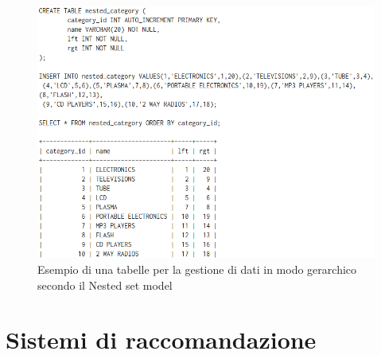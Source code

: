 \begin{figure}[ht!]
    \centering
	\includegraphics[scale=0.6]{images/Nested_Tree_Model_table.PNG}
	\caption{Esempio di una tabelle per la gestione di dati in modo gerarchico secondo il Nested set model}
\end{figure}

\newpage

\section{Sistemi di raccomandazione}





